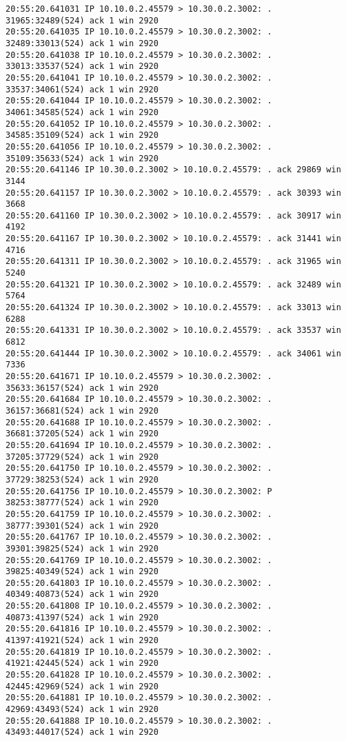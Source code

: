 \documentclass[a4paper,12pt]{article}
\begin{document}
\begin{Verbatim}
20:55:20.641031 IP 10.10.0.2.45579 > 10.30.0.2.3002: . 31965:32489(524) ack 1 win 2920
20:55:20.641035 IP 10.10.0.2.45579 > 10.30.0.2.3002: . 32489:33013(524) ack 1 win 2920
20:55:20.641038 IP 10.10.0.2.45579 > 10.30.0.2.3002: . 33013:33537(524) ack 1 win 2920
20:55:20.641041 IP 10.10.0.2.45579 > 10.30.0.2.3002: . 33537:34061(524) ack 1 win 2920
20:55:20.641044 IP 10.10.0.2.45579 > 10.30.0.2.3002: . 34061:34585(524) ack 1 win 2920
20:55:20.641052 IP 10.10.0.2.45579 > 10.30.0.2.3002: . 34585:35109(524) ack 1 win 2920
20:55:20.641056 IP 10.10.0.2.45579 > 10.30.0.2.3002: . 35109:35633(524) ack 1 win 2920
20:55:20.641146 IP 10.30.0.2.3002 > 10.10.0.2.45579: . ack 29869 win 3144
20:55:20.641157 IP 10.30.0.2.3002 > 10.10.0.2.45579: . ack 30393 win 3668
20:55:20.641160 IP 10.30.0.2.3002 > 10.10.0.2.45579: . ack 30917 win 4192
20:55:20.641167 IP 10.30.0.2.3002 > 10.10.0.2.45579: . ack 31441 win 4716
20:55:20.641311 IP 10.30.0.2.3002 > 10.10.0.2.45579: . ack 31965 win 5240
20:55:20.641321 IP 10.30.0.2.3002 > 10.10.0.2.45579: . ack 32489 win 5764
20:55:20.641324 IP 10.30.0.2.3002 > 10.10.0.2.45579: . ack 33013 win 6288
20:55:20.641331 IP 10.30.0.2.3002 > 10.10.0.2.45579: . ack 33537 win 6812
20:55:20.641444 IP 10.30.0.2.3002 > 10.10.0.2.45579: . ack 34061 win 7336
20:55:20.641671 IP 10.10.0.2.45579 > 10.30.0.2.3002: . 35633:36157(524) ack 1 win 2920
20:55:20.641684 IP 10.10.0.2.45579 > 10.30.0.2.3002: . 36157:36681(524) ack 1 win 2920
20:55:20.641688 IP 10.10.0.2.45579 > 10.30.0.2.3002: . 36681:37205(524) ack 1 win 2920
20:55:20.641694 IP 10.10.0.2.45579 > 10.30.0.2.3002: . 37205:37729(524) ack 1 win 2920
20:55:20.641750 IP 10.10.0.2.45579 > 10.30.0.2.3002: . 37729:38253(524) ack 1 win 2920
20:55:20.641756 IP 10.10.0.2.45579 > 10.30.0.2.3002: P 38253:38777(524) ack 1 win 2920
20:55:20.641759 IP 10.10.0.2.45579 > 10.30.0.2.3002: . 38777:39301(524) ack 1 win 2920
20:55:20.641767 IP 10.10.0.2.45579 > 10.30.0.2.3002: . 39301:39825(524) ack 1 win 2920
20:55:20.641769 IP 10.10.0.2.45579 > 10.30.0.2.3002: . 39825:40349(524) ack 1 win 2920
20:55:20.641803 IP 10.10.0.2.45579 > 10.30.0.2.3002: . 40349:40873(524) ack 1 win 2920
20:55:20.641808 IP 10.10.0.2.45579 > 10.30.0.2.3002: . 40873:41397(524) ack 1 win 2920
20:55:20.641816 IP 10.10.0.2.45579 > 10.30.0.2.3002: . 41397:41921(524) ack 1 win 2920
20:55:20.641819 IP 10.10.0.2.45579 > 10.30.0.2.3002: . 41921:42445(524) ack 1 win 2920
20:55:20.641828 IP 10.10.0.2.45579 > 10.30.0.2.3002: . 42445:42969(524) ack 1 win 2920
20:55:20.641881 IP 10.10.0.2.45579 > 10.30.0.2.3002: . 42969:43493(524) ack 1 win 2920
20:55:20.641888 IP 10.10.0.2.45579 > 10.30.0.2.3002: . 43493:44017(524) ack 1 win 2920

\end{Verbatim}
\end{document}
